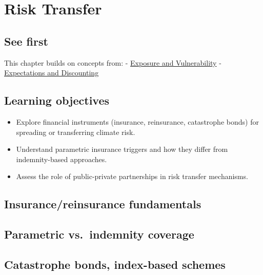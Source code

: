 \documentclass[
  letterpaper,
  DIV=11,
  numbers=noendperiod]{scrreprt}
\providecommand{\tightlist}{%
  \setlength{\itemsep}{0pt}\setlength{\parskip}{0pt}}
\begin{document}

\chapter{Risk Transfer 🚧}\label{risk-transfer}

\section*{See first}\label{see-first-11}


This chapter builds on concepts from: -
\href{./chapters/risk/exposure-vulnerability.qmd}{Exposure and
Vulnerability} -
\href{./chapters/risk/expectations-cost-benefit.qmd}{Expectations and
Discounting}

\section*{Learning objectives}\label{learning-objectives-16}


\begin{itemize}
\tightlist
\item
  Explore financial instruments (insurance, reinsurance, catastrophe
  bonds) for spreading or transferring climate risk.
\item
  Understand parametric insurance triggers and how they differ from
  indemnity-based approaches.
\item
  Assess the role of public-private partnerships in risk transfer
  mechanisms.
\end{itemize}

\section{Insurance/reinsurance
fundamentals}\label{insurancereinsurance-fundamentals}

\section{Parametric vs.~indemnity
coverage}\label{parametric-vs.-indemnity-coverage}

\section{Catastrophe bonds, index-based
schemes}\label{catastrophe-bonds-index-based-schemes}
\end{document}
